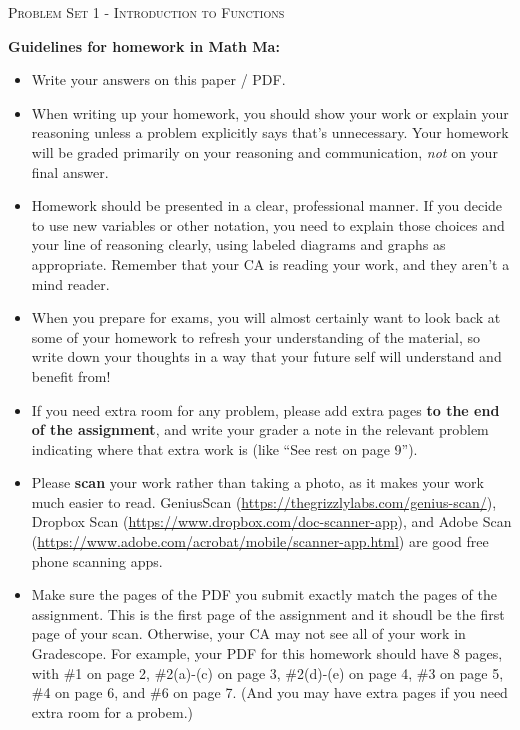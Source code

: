 \documentclass{article}
\begin{document}
\begin{center}
  \large\textsc{Problem Set 1 - Introduction to Functions}
\end{center}

\begin{problemonly}
  \begin{tcolorbox}[colframe=green!80!black, colback=green!10!white, 
    sharp corners, size=fbox, parbox=false, boxrule=0.5mm]
    \textbf{Guidelines for homework in Math Ma:}
    \begin{itemize}
    \item Write your answers on this paper / PDF.

    \item When writing up your homework, you should show your work or explain your reasoning unless a problem explicitly says that's unnecessary. Your homework will be graded primarily on your reasoning and communication, \emph{not} on your final answer.

    \item Homework should be presented in a clear, professional manner. If you decide to use new variables or other notation, you need to explain those choices and your line of reasoning clearly, using labeled diagrams and graphs as appropriate. Remember that your CA is reading your work, and they aren't a mind reader.

    \item When you prepare for exams, you will almost certainly want to look back at some of your homework to refresh your understanding of the material, so write down your thoughts in a way that your future self will understand and benefit from! 

    \item If you need extra room for any problem, please add extra pages \textbf{to the end of the assignment}, and write your grader a note in the relevant problem indicating where that extra work is (like ``See rest on page 9'').

    \item Please \textbf{scan} your work rather than taking a photo, as it makes your work much easier to read. GeniusScan (\url{https://thegrizzlylabs.com/genius-scan/}), Dropbox Scan (\url{https://www.dropbox.com/doc-scanner-app}), and Adobe Scan (\url{https://www.adobe.com/acrobat/mobile/scanner-app.html}) are good free phone scanning apps.

    \item Make sure the pages of the PDF you submit exactly match the pages of the assignment. This is the first page of the assignment and it shoudl be the first page of your scan. Otherwise, your CA may not see all of your work in Gradescope. For example, your PDF for this homework should have 8 pages, with \#1 on page 2, \#2(a)-(c) on page 3, \#2(d)-(e) on page 4, \#3 on page 5, \#4 on page 6, and \#6 on page 7. (And you may have extra pages if you need extra room for a probem.) 


\end{itemize}
\end{tcolorbox}
\end{problemonly}
\end{document}

